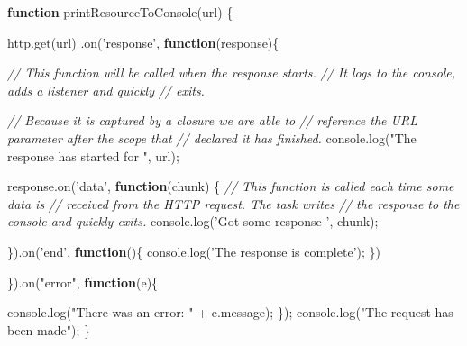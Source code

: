 \documentclass[12pt, ]{article}
\newenvironment{Shaded}{}{}
\newcommand{\KeywordTok}[1]{\textcolor[rgb]{0.00,0.44,0.13}{\textbf{{#1}}}}
\newcommand{\StringTok}[1]{\textcolor[rgb]{0.25,0.44,0.63}{{#1}}}
\newcommand{\CommentTok}[1]{\textcolor[rgb]{0.38,0.63,0.69}{\textit{{#1}}}}
\newcommand{\OtherTok}[1]{\textcolor[rgb]{0.00,0.44,0.13}{{#1}}}
\newcommand{\FunctionTok}[1]{\textcolor[rgb]{0.02,0.16,0.49}{{#1}}}
\newcommand{\NormalTok}[1]{{#1}}
\begin{document}
\begin{Shaded}
\begin{Highlighting}[]
\KeywordTok{function} \FunctionTok{printResourceToConsole}\NormalTok{(url) \{}

   \OtherTok{http}\NormalTok{.}\FunctionTok{get}\NormalTok{(url)}
      \NormalTok{.}\FunctionTok{on}\NormalTok{(}\StringTok{'response'}\NormalTok{, }\KeywordTok{function}\NormalTok{(response)\{}
      
         \CommentTok{// This function will be called when the response starts.}
         \CommentTok{// It logs to the console, adds a listener and quickly }
         \CommentTok{// exits.}
         
         \CommentTok{// Because it is captured by a closure we are able to }
         \CommentTok{// reference the URL parameter after the scope that }
         \CommentTok{// declared it has finished.            }
         \OtherTok{console}\NormalTok{.}\FunctionTok{log}\NormalTok{(}\StringTok{"The response has started for "}\NormalTok{, url);}
      
         \OtherTok{response}\NormalTok{.}\FunctionTok{on}\NormalTok{(}\StringTok{'data'}\NormalTok{, }\KeywordTok{function}\NormalTok{(chunk) \{      }
            \CommentTok{// This function is called each time some data is}
            \CommentTok{// received from the HTTP request. The task writes}
            \CommentTok{// the response to the console and quickly exits.}
            \OtherTok{console}\NormalTok{.}\FunctionTok{log}\NormalTok{(}\StringTok{'Got some response '}\NormalTok{, chunk);}
                   
         \NormalTok{\}).}\FunctionTok{on}\NormalTok{(}\StringTok{'end'}\NormalTok{, }\KeywordTok{function}\NormalTok{()\{}
            \OtherTok{console}\NormalTok{.}\FunctionTok{log}\NormalTok{(}\StringTok{'The response is complete'}\NormalTok{);}
         \NormalTok{\})}
         
      \NormalTok{\}).}\FunctionTok{on}\NormalTok{(}\StringTok{"error"}\NormalTok{, }\KeywordTok{function}\NormalTok{(e)\{}
         
         \OtherTok{console}\NormalTok{.}\FunctionTok{log}\NormalTok{(}\StringTok{"There was an error: "} \NormalTok{+ }\OtherTok{e}\NormalTok{.}\FunctionTok{message}\NormalTok{);}
      \NormalTok{\});      }
   \OtherTok{console}\NormalTok{.}\FunctionTok{log}\NormalTok{(}\StringTok{"The request has been made"}\NormalTok{);}
\NormalTok{\}   }
\end{Highlighting}
\end{Shaded}
\end{document}
